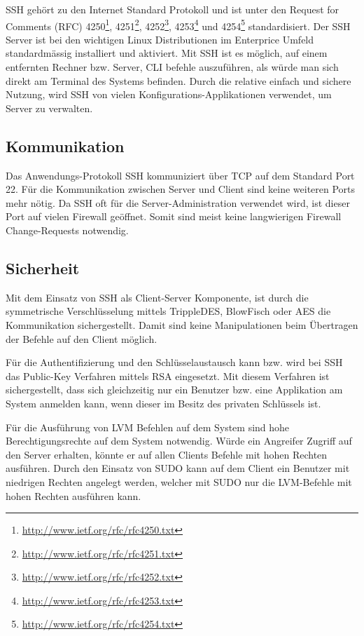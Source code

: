 SSH gehört zu den Internet Standard Protokoll und ist unter den Request for Comments (\gls{RFC}) 4250\footnote{\href{http://www.ietf.org/rfc/rfc4250.txt}{http://www.ietf.org/rfc/rfc4250.txt}}, 4251\footnote{\href{http://www.ietf.org/rfc/rfc4251.txt}{http://www.ietf.org/rfc/rfc4251.txt}}, 4252\footnote{\href{http://www.ietf.org/rfc/rfc4252.txt}{http://www.ietf.org/rfc/rfc4252.txt}}, 4253\footnote{\href{http://www.ietf.org/rfc/rfc4253.txt}{http://www.ietf.org/rfc/rfc4253.txt}} und 4254\footnote{\href{http://www.ietf.org/rfc/rfc4254.txt}{http://www.ietf.org/rfc/rfc4254.txt}} standardisiert. Der SSH Server ist bei den wichtigen Linux Distributionen im Enterprice Umfeld standardmässig installiert und aktiviert. Mit SSH ist es möglich, auf einem entfernten Rechner bzw. Server, CLI befehle auszuführen, als würde man sich direkt am Terminal des Systems befinden.
Durch die relative einfach und sichere Nutzung, wird SSH von vielen Konfigurations-Applikationen verwendet, um Server zu verwalten.


\subsection{Kommunikation}
Das Anwendungs-Protokoll SSH kommuniziert über TCP auf dem Standard Port 22. Für die Kommunikation zwischen Server und Client sind keine weiteren Ports mehr nötig. Da SSH oft für die Server-Administration verwendet wird, ist dieser Port auf vielen Firewall geöffnet. Somit sind meist keine langwierigen Firewall Change-Requests notwendig.


\subsection{Sicherheit}
Mit dem Einsatz von SSH als Client-Server Komponente, ist durch die symmetrische Verschlüsselung mittels \gls{TrippleDES}, \gls{BlowFisch} oder \gls{AES} die Kommunikation sichergestellt. Damit sind keine Manipulationen beim Übertragen der Befehle auf den Client möglich. 

Für die Authentifizierung und den Schlüsselaustausch kann bzw. wird bei SSH das Public-Key Verfahren mittels \gls{RSA} eingesetzt. Mit diesem Verfahren ist sichergestellt, dass sich gleichzeitig nur ein Benutzer bzw. eine Applikation am System anmelden kann, wenn dieser im Besitz des privaten Schlüssels ist.


Für die Ausführung von LVM Befehlen auf dem System sind hohe Berechtigungsrechte auf dem System notwendig. Würde ein Angreifer Zugriff auf den Server erhalten, könnte er auf allen Clients Befehle mit hohen Rechten ausführen. Durch den Einsatz von \gls{SUDO} kann auf dem Client ein Benutzer mit niedrigen Rechten angelegt werden, welcher mit \gls{SUDO} nur die LVM-Befehle mit hohen Rechten ausführen kann.


